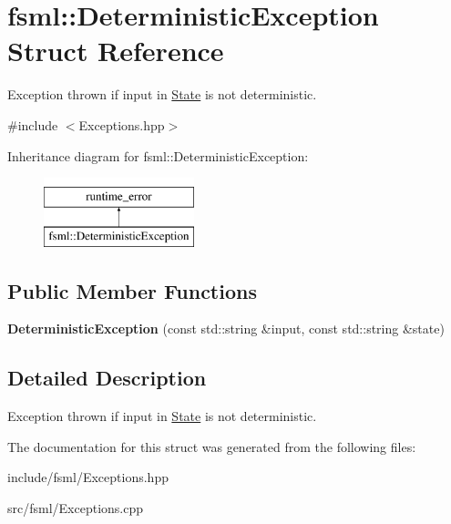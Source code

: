 \hypertarget{structfsml_1_1DeterministicException}{\section{fsml\-:\-:Deterministic\-Exception Struct Reference}
\label{structfsml_1_1DeterministicException}
}


Exception thrown if input in \hyperlink{classfsml_1_1State}{State} is not deterministic.  




{\ttfamily \#include $<$Exceptions.\-hpp$>$}

Inheritance diagram for fsml\-:\-:Deterministic\-Exception\-:\begin{figure}[H]
\begin{center}
\leavevmode
\includegraphics[height=2.000000cm]{structfsml_1_1DeterministicException}
\end{center}
\end{figure}
\subsection*{Public Member Functions}
\begin{DoxyCompactItemize}
\item 
\hypertarget{structfsml_1_1DeterministicException_ac8f4f6c7ee0d7cad65cd1f90ef506b71}{{\bfseries Deterministic\-Exception} (const std\-::string \&input, const std\-::string \&state)}\label{structfsml_1_1DeterministicException_ac8f4f6c7ee0d7cad65cd1f90ef506b71}

\end{DoxyCompactItemize}


\subsection{Detailed Description}
Exception thrown if input in \hyperlink{classfsml_1_1State}{State} is not deterministic. 



The documentation for this struct was generated from the following files\-:\begin{DoxyCompactItemize}
\item 
include/fsml/Exceptions.\-hpp\item 
src/fsml/Exceptions.\-cpp\end{DoxyCompactItemize}
